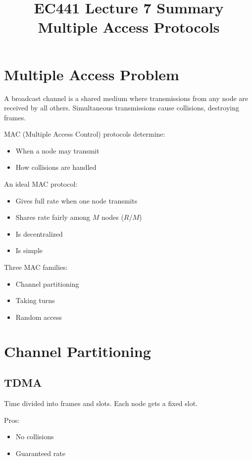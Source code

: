 \documentclass[11pt]{article}
\title{EC441 Lecture 7 Summary \\ Multiple Access Protocols}
\date{}
\begin{document}
\maketitle

\section{Multiple Access Problem}

A broadcast channel is a shared medium where transmissions from any node are received by all others.
Simultaneous transmissions cause collisions, destroying frames.

MAC (Multiple Access Control) protocols determine:
\begin{itemize}
\item When a node may transmit
\item How collisions are handled
\end{itemize}

An ideal MAC protocol:
\begin{itemize}
\item Gives full rate when one node transmits
\item Shares rate fairly among $M$ nodes ($R/M$)
\item Is decentralized
\item Is simple
\end{itemize}

Three MAC families:
\begin{itemize}
\item Channel partitioning
\item Taking turns
\item Random access
\end{itemize}

\section{Channel Partitioning}

\subsection{TDMA}
Time divided into frames and slots.
Each node gets a fixed slot.

Pros:
\begin{itemize}
\item No collisions
\item Guaranteed rate
\end{itemize}
\end{document}
